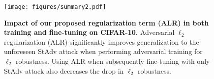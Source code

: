 
\begin{figure}[th]
    \centering
    \texttt{[image: figures/summary2.pdf]}
        \vspace{-20pt}
    \caption{\textbf{Impact of our proposed regularization term (ALR) in both training and fine-tuning on CIFAR-10.}  Adversarial $\ell_2$ regularization (ALR) significantly improves generalization to the unforeseen StAdv attack when performing adversarial training for $\ell_2$ robustness.  Using ALR when subsequently fine-tuning with only StAdv attack also decreases the drop in $\ell_2$ robustness.}
    \label{fig:summary}
    \vspace{-20pt}
\end{figure}

